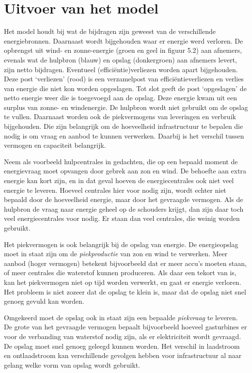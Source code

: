 \documentclass[
  11pt,
  a4paper,
]{book}
\begin{document}
\hypertarget{uitvoer-van-het-model}{%
\section{Uitvoer van het model}\label{uitvoer-van-het-model}}

Het model houdt bij wat de bijdragen zijn geweest van de verschillende energiebronnen. Daarnaast wordt bijgehouden waar er energie werd verloren. De opbrengst uit wind- en zonne-energie (groen en geel in figuur 5.2) aan afnemers, evenals wat de hulpbron (blauw) en opslag (donkergroen) aan afnemers levert, zijn netto bijdragen. Eventueel (efficiëntie)verliezen worden apart bijgehouden. Deze post `verliezen' (rood) is een verzamelpost van efficiëntieverliezen en verlies van energie die niet kon worden opgeslagen. Tot slot geeft de post `opgeslagen' de netto energie weer die is toegevoegd aan de opslag. Deze energie kwam uit een surplus van zonne- en windenergie. De hulpbron wordt niet gebruikt om de opslag te vullen. Daarnaast worden ook de piekvermogens van leveringen en verbruik bijgehouden. Die zijn belangrijk om de hoeveelheid infrastructuur te bepalen die nodig is om vraag en aanbod te kunnen verwerken. Daarbij is het verschil tussen vermogen en capaciteit belangrijk.

Neem als voorbeeld hulpcentrales in gedachten, die op een bepaald moment de energievraag moet opvangen door gebrek aan zon en wind. De behoefte aan extra energie kan kort zijn, en in dat geval hoeven de energiecentrales ook niet veel energie te leveren. Hoeveel centrales hier voor nodig zijn, wordt echter niet bepaald door de hoeveelheid energie, maar door het gevraagde vermogen. Als de hulpbron de vraag naar energie geheel op de schouders krijgt, dan zijn daar toch veel energiecentrales voor nodig. Er staan dan veel centrales, die weinig worden gebruikt.

Het piekvermogen is ook belangrijk bij de opslag van energie. De energieopslag moet in staat zijn om de \emph{piekproductie} van zon en wind te verwerken. Meer aanbod (hoger vermogen) betekent bijvoorbeeld dat er meer accu's moeten staan, of meer centrales die waterstof kunnen produceren. Als daar een tekort van is, kan het piekvermogen niet op tijd worden verwerkt, en gaat er energie verloren. Het probleem is niet zozeer dat de opslag te klein is, maar dat de opslag niet snel genoeg gevuld kan worden.

Omgekeerd moet de opslag ook in staat zijn een bepaalde \emph{piekvraag} te leveren. De grote van het gevraagde vermogen bepaalt bijvoorbeeld hoeveel gasturbines er voor de verbanding van waterstof nodig zijn, als er elektriciteit wordt gevraagd. De opslag moet snel genoeg geleegd kunnen worden. Het verschil in laadstroom en ontlaadstroom kan verschillende gevolgen hebben voor infrastructuur al naar gelang welke vorm van opslag wordt gebruikt.
\end{document}
